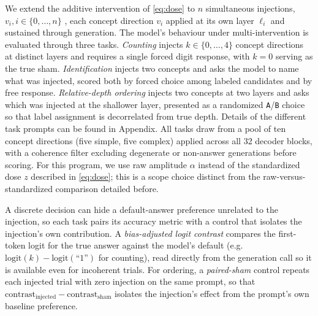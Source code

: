 We extend the additive intervention of \cref{eq:dose} to $n$ simultaneous injections, $v_i, i\in\{0,\dots,n\}$ , each concept direction $v_i$ applied at its own layer $\ell_i$ and sustained through generation.
The model's behaviour under multi-intervention is evaluated through three tasks.
\emph{Counting} injects $k\in\{0,\dots,4\}$ concept directions at distinct layers and requires a single forced digit response, with $k{=}0$ serving as the true sham.
\emph{Identification} injects two concepts and asks the model to name what was injected, scored both by forced choice among labeled candidates and by free response.
\emph{Relative-depth ordering} injects two concepts at two layers and asks which was injected at the shallower layer, presented as a randomized \texttt{A}/\texttt{B} choice so that label assignment is decorrelated from true depth. Details of the different task prompts can be found in Appendix.
All tasks draw from a pool of ten concept directions (five simple, five complex) applied across all 32 decoder blocks, with a coherence filter excluding degenerate or non-answer generations before scoring.
For this program, we use raw amplitude $\alpha$ instead of the standardized dose $z$ described in \cref{eq:dose}; this is a scope choice distinct from the raw-versus-standardized comparison detailed before.

A discrete decision can hide a default-answer preference unrelated to the injection, so each task pairs its accuracy metric with a control that isolates the injection's own contribution.
A \emph{bias-adjusted logit contrast} compares the first-token logit for the true answer against the model's default (e.g.\ $\mathrm{logit}(k)-\mathrm{logit}(\text{``1''})$ for counting), read directly from the generation call so it is available even for incoherent trials.
For ordering, a \emph{paired-sham} control repeats each injected trial with zero injection on the same prompt, so that $\text{contrast}_{\text{injected}}-\text{contrast}_{\text{sham}}$ isolates the injection's effect from the prompt's own baseline preference.
